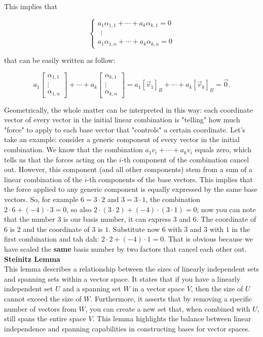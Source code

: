 This implies that

$$
\begin{cases}
a_1 \alpha_{1,1} + \cdots + a_k \alpha_{k,1} = 0 \\
\ \ \vdots\\
a_1 \alpha_{1,n} + \cdots + a_k \alpha_{k,n} = 0
\end{cases}
$$

that can be easily written as follow:

$$
a_1 \begin{bmatrix}
\alpha_{1,1}\\
\vdots\\
\alpha_{1,n}
\end{bmatrix} + \cdots + a_{k} \begin{bmatrix}
\alpha_{k,1}\\
\vdots\\
\alpha_{k,n}
\end{bmatrix}
= a_1 [\vec v_1]_B + \cdots + a_k [\vec v_k]_B = \vec 0.
$$

Geometrically, the whole matter can be interpreted in this way: each coordinate vector of every vector in the initial linear combination is "telling" how much "force" to apply to each base vector that "controls" a certain coordinate. Let's take an example: consider a generic component of every vector in the initial combination. We know that the combination $a_1 v_i + \cdots + a_k v_i$ equals zero, which tells us that the forces acting on the $i$-th component of the combination cancel out. However, this component (and all other components) stem from a sum of a linear combination of the $i$-th components of the base vectors. This implies that the force applied to any generic component is equally expressed by the same base vectors. So, for example $6=3\cdot2$ and $3=3\cdot1$, the combination $2 \cdot 6 + (-4) \cdot 3 = 0$, so also $2 \cdot (3\cdot2) + (-4) \cdot (3\cdot1) = 0$; now you can note that the number $3$ is our basis number, it can express $3$ and $6$.
The coordinate of $6$ is $2$ and the coordinate of $3$ is $1$. Substitute now $6$ with $3$ and $3$ with $1$ in the first combination and tah dah: $2 \cdot 2 + (-4) \cdot 1 = 0$. That is obvious because we have scaled the \textbf{same} basis number by two factors that cancel each other out.
\\

\textbf{Steinitz Lemma}\\
This lemma describes a relationship between the sizes of linearly independent sets and spanning sets within a vector space. It states that if you have a linearly independent set $U$ and a spanning set $W$ in a vector space $V$, then the size of $U$ cannot exceed the size of $W$. Furthermore, it asserts that by removing a specific number of vectors from $W$, you can create a new set that, when combined with $U$, still spans the entire space $V$. This lemma highlights the balance between linear independence and spanning capabilities in constructing bases for vector spaces.

